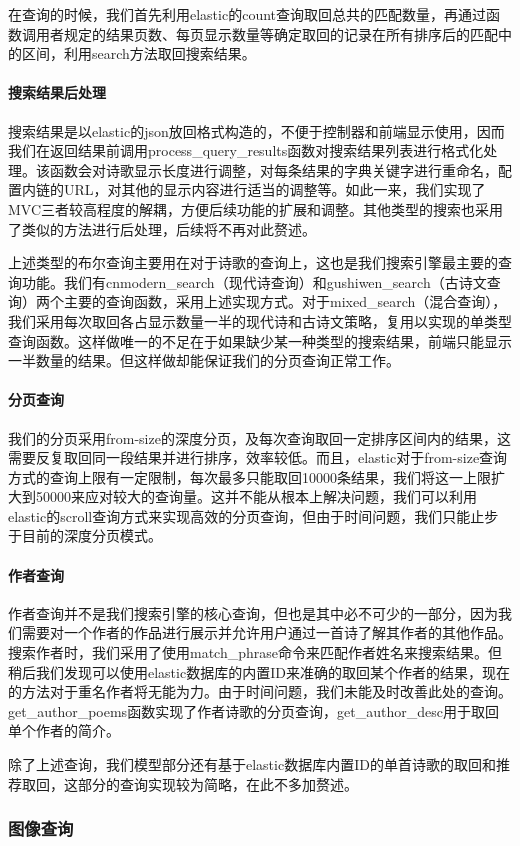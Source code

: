 \documentclass[a4paper, 10pt]{article}
\begin{document}
在查询的时候，我们首先利用elastic的count查询取回总共的匹配数量，再通过函数调用者规定的结果页数、每页显示数量等确定取回的记录在所有排序后的匹配中的区间，利用search方法取回搜索结果。

\paragraph*{搜索结果后处理} 搜索结果是以elastic的json放回格式构造的，不便于控制器和前端显示使用，因而我们在返回结果前调用process\_query\_results函数对搜索结果列表进行格式化处理。该函数会对诗歌显示长度进行调整，对每条结果的字典关键字进行重命名，配置内链的URL，对其他的显示内容进行适当的调整等。如此一来，我们实现了MVC三者较高程度的解耦，方便后续功能的扩展和调整。其他类型的搜索也采用了类似的方法进行后处理，后续将不再对此赘述。

上述类型的布尔查询主要用在对于诗歌的查询上，这也是我们搜索引擎最主要的查询功能。我们有cnmodern\_search（现代诗查询）和gushiwen\_search（古诗文查询）两个主要的查询函数，采用上述实现方式。对于mixed\_search（混合查询），我们采用每次取回各占显示数量一半的现代诗和古诗文策略，复用以实现的单类型查询函数。这样做唯一的不足在于如果缺少某一种类型的搜索结果，前端只能显示一半数量的结果。但这样做却能保证我们的分页查询正常工作。

\paragraph*{分页查询} 我们的分页采用from-size的深度分页，及每次查询取回一定排序区间内的结果，这需要反复取回同一段结果并进行排序，效率较低。而且，elastic对于from-size查询方式的查询上限有一定限制，每次最多只能取回10000条结果，我们将这一上限扩大到50000来应对较大的查询量。这并不能从根本上解决问题，我们可以利用elastic的scroll查询方式来实现高效的分页查询，但由于时间问题，我们只能止步于目前的深度分页模式。

\paragraph*{作者查询} 作者查询并不是我们搜索引擎的核心查询，但也是其中必不可少的一部分，因为我们需要对一个作者的作品进行展示并允许用户通过一首诗了解其作者的其他作品。搜索作者时，我们采用了使用match\_phrase命令来匹配作者姓名来搜索结果。但稍后我们发现可以使用elastic数据库的内置ID来准确的取回某个作者的结果，现在的方法对于重名作者将无能为力。由于时间问题，我们未能及时改善此处的查询。get\_author\_poems函数实现了作者诗歌的分页查询，get\_author\_desc用于取回单个作者的简介。

除了上述查询，我们模型部分还有基于elastic数据库内置ID的单首诗歌的取回和推荐取回，这部分的查询实现较为简略，在此不多加赘述。

\subsubsection{图像查询}
\end{document}
